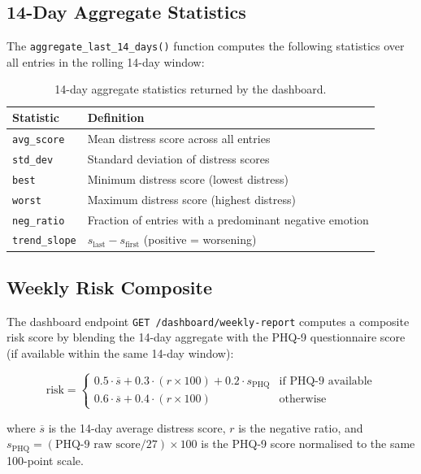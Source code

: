 \documentclass[12pt,a4paper]{article}
\begin{document}
\subsection{14-Day Aggregate Statistics}

The \texttt{aggregate\_last\_14\_days()} function computes the following
statistics over all entries in the rolling 14-day window:

\begin{table}[H]
\centering
\caption{14-day aggregate statistics returned by the dashboard.}
\label{tab:agg}
\begin{tabular}{ll}
\toprule
\textbf{Statistic} & \textbf{Definition} \\
\midrule
\texttt{avg\_score}    & Mean distress score across all entries \\
\texttt{std\_dev}      & Standard deviation of distress scores \\
\texttt{best}          & Minimum distress score (lowest distress) \\
\texttt{worst}         & Maximum distress score (highest distress) \\
\texttt{neg\_ratio}    & Fraction of entries with a predominant negative emotion \\
\texttt{trend\_slope}  & $s_{\text{last}} - s_{\text{first}}$ (positive = worsening) \\
\bottomrule
\end{tabular}
\end{table}

\subsection{Weekly Risk Composite}

The dashboard endpoint \texttt{GET /dashboard/weekly-report} computes a
composite risk score by blending the 14-day aggregate with the PHQ-9
questionnaire score (if available within the same 14-day window):

\begin{equation}
\text{risk} =
\begin{cases}
0.5 \cdot \overline{s} + 0.3 \cdot (r \times 100) + 0.2 \cdot s_{\text{PHQ}}
  & \text{if PHQ-9 available} \\[4pt]
0.6 \cdot \overline{s} + 0.4 \cdot (r \times 100)
  & \text{otherwise}
\end{cases}
\end{equation}

where $\overline{s}$ is the 14-day average distress score,
$r$ is the negative ratio, and
$s_{\text{PHQ}} = ({\text{PHQ-9 raw score}} / 27) \times 100$
is the PHQ-9 score normalised to the same 100-point scale.
\end{document}
